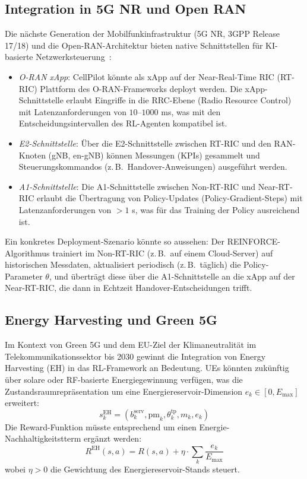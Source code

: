 ﻿\documentclass[a4paper,12pt]{article}
\theoremstyle{definition}
\begin{document}
\subsection{Integration in 5G NR und Open RAN}

Die n\"achste Generation der Mobilfunkinfrastruktur (5G NR, 3GPP Release 17/18)
und die Open-RAN-Architektur bieten native Schnittstellen f\"ur KI-basierte
Netzwerksteuerung~\cite{polese2022}:

\begin{itemize}
  \item \emph{O-RAN xApp}: CellPilot k\"onnte als xApp auf der Near-Real-Time RIC (RT-RIC)
    Plattform des O-RAN-Frameworks deployt werden. Die xApp-Schnittstelle erlaubt
    Eingriffe in die RRC-Ebene (Radio Resource Control) mit Latenzanforderungen
    von $10$--$1000$ ms, was mit den Entscheidungsintervallen des RL-Agenten kompatibel ist.
  \item \emph{E2-Schnittstelle}: \"Uber die E2-Schnittstelle zwischen RT-RIC und
    den RAN-Knoten (gNB, en-gNB) k\"onnen Messungen (KPIs) gesammelt und
    Steuerungskommandos (z.\,B.\ Handover-Anweisungen) ausgef\"uhrt werden.
  \item \emph{A1-Schnittstelle}: Die A1-Schnittstelle zwischen Non-RT-RIC und
    Near-RT-RIC erlaubt die \"Ubertragung von Policy-Updates (Policy-Gradient-Steps)
    mit Latenzanforderungen von $> 1$ s, was f\"ur das Training der Policy
    ausreichend ist.
\end{itemize}

Ein konkretes Deployment-Szenario k\"onnte so aussehen: Der REINFORCE-Algorithmus
trainiert im Non-RT-RIC (z.\,B.\ auf einem Cloud-Server) auf historischen Messdaten,
aktualisiert periodisch (z.\,B.\ t\"aglich) die Policy-Parameter $\theta$, und
\"ubertr\"agt diese \"uber die A1-Schnittstelle an die xApp auf der Near-RT-RIC,
die dann in Echtzeit Handover-Entscheidungen trifft.

\subsection{Energy Harvesting und Green 5G}

Im Kontext von Green 5G und dem EU-Ziel der Klimaneutralit\"at im Telekommunikationssektor
bis 2030 gewinnt die Integration von Energy Harvesting (EH) in das RL-Framework an Bedeutung.
UEs k\"onnten zuk\"unftig \"uber solare oder RF-basierte Energiegewinnung verf\"ugen, was die
Zustandsraumrepräsentation um eine Energiereservoir-Dimension $e_k \in [0, E_{\max}]$ erweitert:
\[
  s_k^{\mathrm{EH}} = (b_k^{\mathrm{serv}}, \mathrm{pm}_k, \theta_k^{\mathrm{tp}}, m_k, e_k)
\]
Die Reward-Funktion m\"usste entsprechend um einen Energie-Nachhaltigkeitstterm erg\"anzt werden:
\[
  R^{\mathrm{EH}}(s, a) = R(s, a) + \eta \cdot \sum_k \frac{e_k}{E_{\max}}
\]
wobei $\eta > 0$ die Gewichtung des Energiereservoir-Stands steuert.
\end{document}
